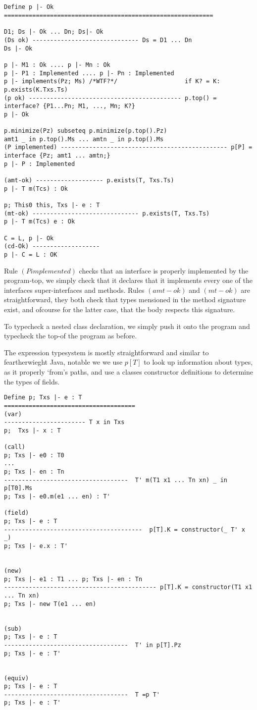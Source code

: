 \begin{verbatim}


Define p |- Ok
===========================================================

D1; Ds |- Ok ... Dn; Ds|- Ok
(Ds ok) ------------------------------ Ds = D1 ... Dn
Ds |- Ok

p |- M1 : Ok .... p |- Mn : Ok
p |- P1 : Implemented .... p |- Pn : Implemented
p |- implements(Pz; Ms) /*WTF?*/                   if K? = K: p.exists(K.Txs.Ts)
(p ok) ------------------------------------------- p.top() = interface? {P1...Pn; M1, ..., Mn; K?}
p |- Ok

p.minimize(Pz) subseteq p.minimize(p.top().Pz)
amt1 _ in p.top().Ms ... amtn _ in p.top().Ms
(P implemented) ----------------------------------------------- p[P] = interface {Pz; amt1 ... amtn;}
p |- P : Implemented

(amt-ok) ------------------- p.exists(T, Txs.Ts)
p |- T m(Tcs) : Ok

p; This0 this, Txs |- e : T
(mt-ok) ------------------------------ p.exists(T, Txs.Ts)
p |- T m(Tcs) e : Ok

C = L, p |- Ok
(cd-Ok) -------------------
p |- C = L : OK

\end{verbatim}

Rule $(P implemented)$ checks that an interface is properly implemented by the program-top, we simply check that it declares that it implements every one of the interfaces super-interfaces and methods.
Rules $(amt-ok)$ and $(mt-ok)$ are straightforward, they both check that types mensioned in the method signature exist, and ofcourse for the latter case, that the body respects this signature.

To typecheck a nested class declaration, we simply push it onto the program and typecheck the top-of the program as before.


The expression typesystem is mostly straightforward and similar to feartherwieght Java, notable we we use $p[T]$ to look up information about types, as it properly ‘from’s paths, and use a classes constructor definitions to determine the types of fields.

\begin{verbatim}
Define p; Txs |- e : T
=====================================
(var)
----------------------- T x in Txs
p;  Txs |- x : T

(call)
p; Txs |- e0 : T0
...
p; Txs |- en : Tn
-----------------------------------  T' m(T1 x1 ... Tn xn) _ in p[T0].Ms
p; Txs |- e0.m(e1 ... en) : T'

(field)
p; Txs |- e : T
---------------------------------------  p[T].K = constructor(_ T' x _)
p; Txs |- e.x : T'


(new)
p; Txs |- e1 : T1 ... p; Txs |- en : Tn
------------------------------------------- p[T].K = constructor(T1 x1 ... Tn xn)
p; Txs |- new T(e1 ... en)


(sub)
p; Txs |- e : T
-----------------------------------  T' in p[T].Pz
p; Txs |- e : T'


(equiv)
p; Txs |- e : T
-----------------------------------  T =p T'
p; Txs |- e : T'
\end{verbatim}

